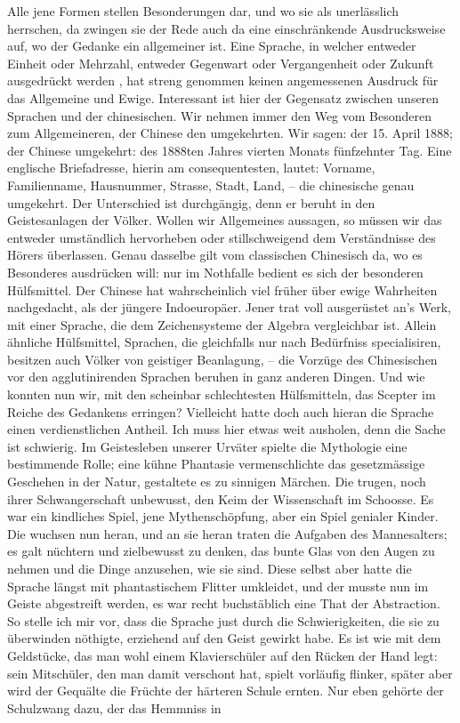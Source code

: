 Alle jene Formen stellen Besonderungen dar, und wo sie als unerlässlich herrschen, da zwingen sie der Rede auch da eine einschränkende Ausdrucksweise auf, wo der Gedanke ein allgemeiner ist. Eine Sprache, in welcher entweder Einheit oder Mehrzahl, entweder Gegenwart oder Vergangenheit oder Zukunft ausgedrückt werden , hat streng genommen keinen angemessenen Ausdruck für das Allgemeine und Ewige. Interessant ist hier der Gegensatz \label{sp.447} zwischen unseren Sprachen und der \label{fp.426} chinesischen. Wir nehmen immer den Weg vom Besonderen zum Allgemeineren, der Chinese den umgekehrten. Wir sagen: der 15. April 1888; der Chinese umgekehrt: des 1888ten Jahres vierten Monats fünfzehnter Tag. Eine englische Briefadresse, hierin am consequentesten, lautet: Vorname, Familienname, Hausnummer, Strasse, Stadt, Land, – die chinesische genau umgekehrt. Der Unterschied ist durchgängig, denn er beruht in den Geistesanlagen der Völker. Wollen wir Allgemeines aussagen, so müssen wir das entweder umständlich hervorheben oder stillschweigend dem Verständnisse des Hörers überlassen. Genau dasselbe gilt vom classischen Chinesisch da, wo es Besonderes ausdrücken will: nur im Nothfalle bedient es sich der besonderen Hülfsmittel. Der Chinese hat wahrscheinlich viel früher über ewige Wahrheiten nachgedacht, als der jüngere Indoeuropäer. Jener trat voll ausgerüstet an’s Werk, mit einer Sprache, die dem Zeichensysteme der Algebra vergleichbar ist. Allein ähnliche Hülfsmittel, Sprachen, die gleichfalls nur nach Bedürfniss specialisiren, besitzen auch Völker von  geistiger Beanlagung, – die Vorzüge des Chinesischen vor den agglutinirenden Sprachen beruhen in ganz anderen Dingen. Und wie konnten nun wir, mit den scheinbar schlechtesten Hülfsmitteln, das Scepter im Reiche des Gedankens erringen? Vielleicht hatte doch auch hieran die Sprache einen verdienstlichen Antheil. Ich muss hier etwas weit ausholen, denn die Sache ist schwierig. Im Geistesleben unserer Urväter spielte die Mythologie eine bestimmende Rolle; eine kühne Phantasie vermenschlichte das gesetzmässige Geschehen in der Natur, gestaltete es zu sinnigen Märchen. Die trugen, noch ihrer Schwangerschaft unbewusst, den Keim der Wissenschaft im Schoosse. Es war ein kindliches Spiel, jene Mythenschöpfung, aber ein Spiel genialer Kinder. Die wuchsen nun heran, und an sie heran traten die Aufgaben des Mannesalters; es galt nüchtern und zielbewusst zu denken, das bunte Glas von den Augen zu nehmen und die Dinge anzusehen, wie sie sind. Diese selbst aber hatte die Sprache längst mit phantastischem Flitter umkleidet, und der musste nun im Geiste abgestreift werden, es war recht buchstäblich eine That der Abstraction. So stelle ich mir vor, dass die Sprache just durch die Schwierigkeiten, die sie zu überwinden nöthigte, erziehend auf den Geist gewirkt habe. Es ist wie mit dem Geldstücke, das man wohl einem Klavierschüler auf den Rücken der Hand legt: sein Mitschüler, den man damit verschont hat, spielt vorläufig flinker, später aber wird der Ge\label{fp.427}quälte die Früchte der härteren Schule ernten. Nur eben gehörte der Schulzwang dazu, der das Hemmniss in 